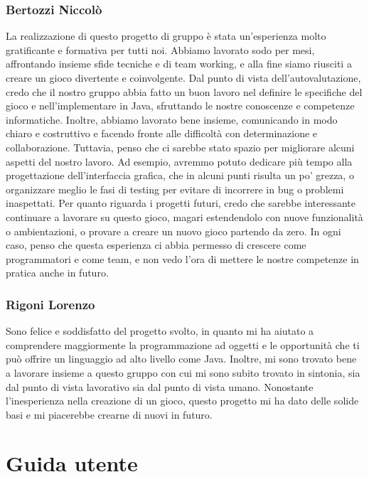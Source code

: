 \documentclass[a4paper,12pt]{report}
\begin{document}
\subsection*{Bertozzi Niccolò}
La realizzazione di questo progetto di gruppo è stata un'esperienza molto gratificante e formativa per tutti noi. Abbiamo lavorato sodo per mesi, affrontando insieme sfide tecniche e di team working, e alla fine siamo riusciti a creare un gioco divertente e coinvolgente.
Dal punto di vista dell'autovalutazione, credo che il nostro gruppo abbia fatto un buon lavoro nel definire le specifiche del gioco e nell'implementare in Java, sfruttando le nostre conoscenze e competenze informatiche. Inoltre, abbiamo lavorato bene insieme, comunicando in modo chiaro e costruttivo e facendo fronte alle difficoltà con determinazione e collaborazione.
Tuttavia, penso che ci sarebbe stato spazio per migliorare alcuni aspetti del nostro lavoro. Ad esempio, avremmo potuto dedicare più tempo alla progettazione dell'interfaccia grafica, che in alcuni punti risulta un po' grezza, o organizzare meglio le fasi di testing per evitare di incorrere in bug o problemi inaspettati.
Per quanto riguarda i progetti futuri, credo che sarebbe interessante continuare a lavorare su questo gioco, magari estendendolo con nuove funzionalità o ambientazioni, o provare a creare un nuovo gioco partendo da zero. In ogni caso, penso che questa esperienza ci abbia permesso di crescere come programmatori e come team, e non vedo l'ora di mettere le nostre competenze in pratica anche in futuro.

\subsection*{Rigoni Lorenzo}
Sono felice e soddisfatto del progetto svolto, in quanto mi ha aiutato a comprendere maggiormente la programmazione ad oggetti e le opportunità che ti può offrire un linguaggio ad alto livello come Java. Inoltre, mi sono trovato bene a lavorare insieme a questo gruppo con cui mi sono subito trovato in sintonia, sia dal punto di vista lavorativo sia dal punto di vista umano. Nonostante l’inesperienza nella creazione di un gioco, questo progetto mi ha dato delle solide basi e mi piacerebbe crearne di nuovi in futuro.

\appendix
\chapter{Guida utente}
\end{document}
